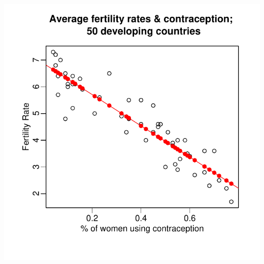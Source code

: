 \documentclass[pdflatex,landscape,titlepage]{foils}
\begin{document}
\begin{center}
\color{black}
\includegraphics[width=6.7 in]{predictedfert1}
\color{white}
\end{center}
\end{document}

